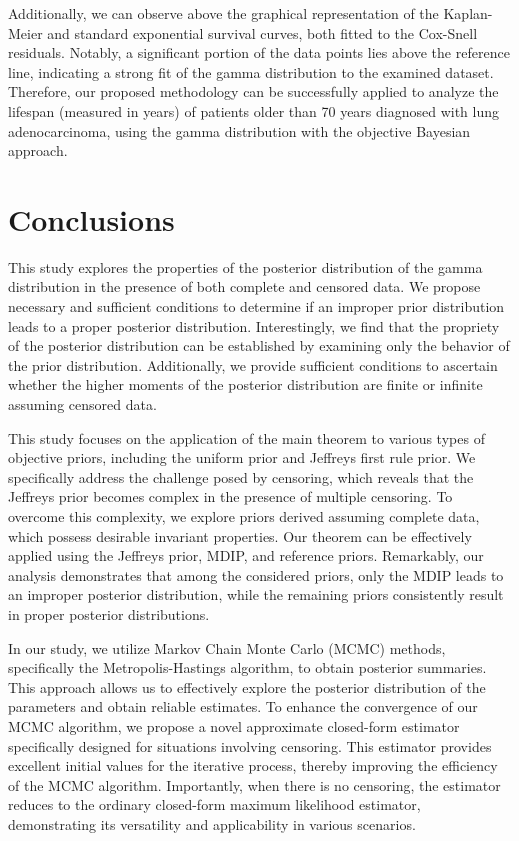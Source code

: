 \documentclass[]{interact}
\theoremstyle{plain}%
\theoremstyle{definition}
\theoremstyle{remark}
\begin{document}
Additionally, we can observe above the graphical representation of the Kaplan-Meier and standard exponential survival curves, both fitted to the Cox-Snell residuals. Notably, a significant portion of the data points lies above the reference line, indicating a strong fit of the gamma distribution to the examined dataset. Therefore, our proposed methodology can be successfully applied to analyze the lifespan (measured in years) of patients older than 70 years diagnosed with lung adenocarcinoma, using the gamma distribution with the objective Bayesian approach.

\section{Conclusions}\label{sec:6}

This study explores the properties of the posterior distribution of the gamma distribution in the presence of both complete and censored data. We propose necessary and sufficient conditions to determine if an improper prior distribution leads to a proper posterior distribution. Interestingly, we find that the propriety of the posterior distribution can be established by examining only the behavior of the prior distribution. Additionally, we provide sufficient conditions to ascertain whether the higher moments of the posterior distribution are finite or infinite assuming censored data.

This study focuses on the application of the main theorem to various types of objective priors, including the uniform prior and Jeffreys first rule prior. We specifically address the challenge posed by censoring, which reveals that the Jeffreys prior becomes complex in the presence of multiple censoring. To overcome this complexity, we explore priors derived assuming complete data, which possess desirable invariant properties. Our theorem can be effectively applied using the Jeffreys prior, MDIP, and reference priors. Remarkably, our analysis demonstrates that among the considered priors, only the MDIP leads to an improper posterior distribution, while the remaining priors consistently result in proper posterior distributions.

In our study, we utilize Markov Chain Monte Carlo (MCMC) methods, specifically the Metropolis-Hastings algorithm, to obtain posterior summaries. This approach allows us to effectively explore the posterior distribution of the parameters and obtain reliable estimates. To enhance the convergence of our MCMC algorithm, we propose a novel approximate closed-form estimator specifically designed for situations involving censoring. This estimator provides excellent initial values for the iterative process, thereby improving the efficiency of the MCMC algorithm. Importantly, when there is no censoring, the estimator reduces to the ordinary closed-form maximum likelihood estimator, demonstrating its versatility and applicability in various scenarios.
\end{document}
